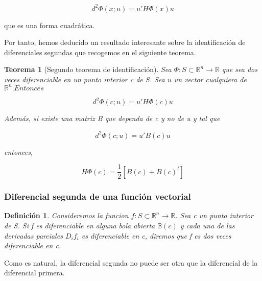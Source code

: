 \documentclass{article}
\theoremstyle{theorem-style}  %
\newtheorem{theorem}{Teorema}[section]  %
\theoremstyle{definition-style}
\newtheorem{definition}{Definición}[section]
\theoremstyle{example-style}
\theoremstyle{exercise-style}
\begin{document}
	$$d^2 \Phi(x;u) = u' H \Phi(x) u$$
	
	que es una forma cuadrática.
	
	Por tanto, hemos deducido un resultado interesante sobre la identificación de diferenciales segundas que recogemos en el siguiente teorema.
	
	\begin{theorem}[Segundo teorema de identificación]
		Sea $\Phi: S \subset \mathbb{R}^n \rightarrow \mathbb{R}$ que sea dos veces diferenciable en un punto interior c de S. Sea $u$ un vector cualquiera de $\mathbb{R}^n. Entonces$
		
		$$d^2 \Phi(c;u) = u' H \Phi(c)u$$
		
		Además, si existe una matriz B que dependa de c y no de u y tal que
		
		$$ d^2 \Phi(c;u) = u' B(c) u $$
		
		entonces, 
		
		$$ H \Phi(c) = \frac{1}{2} [B(c) + B(c)^t]$$
		
	\end{theorem}
	
	
	
	\subsubsection{Diferencial segunda de una función vectorial}
	
	\begin{definition}
		Consideremos la funcion $f: S \subset \mathbb{R}^n \rightarrow \mathbb{R}$. Sea c un punto interior de S. Si f es diferenciable en alguna bola abierta $\mathbb{B}(c)$ y cada una de las derivadas parciales $D_i f_i$ es diferenciable en c, diremos que f es dos veces diferenciable en c.
	\end{definition}
	
	Como es natural, la diferencial segunda no puede ser otra que la diferencial de la diferencial primera. 
	
\end{document}
